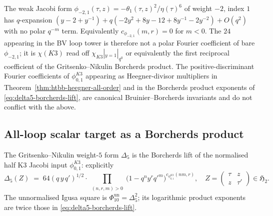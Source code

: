 \begin{remark}
\label{rem:phi-weak-jacobi-holomorphic}
The weak Jacobi form
$\phi_{-2,1}(\tau,z) = -\theta_1(\tau,z)^{2}/\eta(\tau)^{6}$
of weight $-2$, index $1$
\cite[\S 9, Theorem 9.3]{EichlerZagier1985} has $q$-expansion
$(y - 2 + y^{-1}) + q(-2y^{2}+8y-12+8y^{-1}-2y^{-2})+O(q^{2})$
with no polar $q^{-m}$ term. Equivalently
$c_{\phi_{-2,1}}(m,r) = 0$ for $m < 0$. The $24$ appearing in the
BV loop tower is therefore not a polar Fourier coefficient of bare
$\phi_{-2,1}$; it is $\chi(K3)$ read off $\chi_{K3}|_{y=1}|_{q^{0}}$
or equivalently the first reciprocal coefficient of
the Gritsenko--Nikulin Borcherds product. The positive-discriminant
Fourier coefficients of \(\phi_{0,1}^{K3}\) appearing as
Heegner-divisor multipliers in
Theorem~\ref{thm:htbb-heegner-all-order} and in the Borcherds product
exponents of \eqref{eq:delta5-borcherds-lift}, are canonical
Bruinier--Borcherds invariants and do not conflict with the above.
\end{remark}

\subsection{All-loop scalar target as a Borcherds product}
\label{subsec:hcs-borcherds}

The Gritsenko--Nikulin weight-$5$ form $\Delta_5$ is the Borcherds lift
of the normalised half K3 Jacobi input $\phi_{0,1}^{K3}$: explicitly
\begin{equation}\label{eq:delta5-borcherds-lift}
 \Delta_5(Z)
 \;=\;
 64(q\,y\,q')^{1/2}\cdot
 \prod_{\substack{(n,r,m)>0}}
 \bigl(1 - q^{n}y^{r}q'^{m}\bigr)^{c_{\phi_{0,1}^{K3}}(nm,r)},
 \quad
 Z = \begin{pmatrix}\tau & z \\ z & \tau'\end{pmatrix}\in\mathfrak{H}_{2}.
\end{equation}
The unnormalised Igusa square is \(\Phi_{10}^{\mathrm{un}}=\Delta_5^2\);
its logarithmic product exponents are twice those in
\eqref{eq:delta5-borcherds-lift}.

